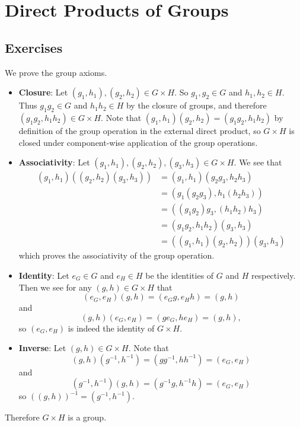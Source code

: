 \section{Direct Products of Groups}
\subsection*{Exercises}
\begin{questions}
    \item We prove the group axioms.
    \begin{itemize}
        \item \textbf{Closure}: Let $(g_1, h_1), (g_2, h_2) \in G \times H$. So $g_1, g_2 \in G$ and $h_1, h_2 \in H$. Thus $g_1g_2 \in G$ and $h_1h_2 \in H$ by the closure of groups, and therefore $(g_1g_2, h_1h_2) \in G\times H$. Note that $(g_1, h_1)(g_2, h_2) = (g_1g_2, h_1h_2)$ by definition of the group operation in the external direct product, so $G \times H$ is closed under component-wise application of the group operations.

        \item \textbf{Associativity}: Let $(g_1, h_1), (g_2, h_2), (g_3, h_3) \in G \times H$. We see that
        \begin{align*}
            (g_1, h_1)\left((g_2, h_2)(g_3, h_3)\right) &= (g_1, h_1)(g_2g_3, h_2h_3)\\
            &= (g_1(g_2g_3), h_1(h_2h_3))\\
            &= ((g_1g_2)g_3, (h_1h_2)h_3)\\
            &= (g_1g_2, h_1h_2)(g_3,h_3)\\
            &= \left((g_1,h_1)(g_2,h_2)\right)(g_3,h_3)
        \end{align*}
        which proves the associativity of the group operation.

        \item \textbf{Identity}: Let $e_G \in G$ and $e_H \in H$ be the identities of $G$ and $H$ respectively. Then we see for any $(g, h) \in G \times H$ that
        \[
            (e_G, e_H)(g, h) = (e_Gg, e_Hh) = (g, h)
        \]
        and
        \[
            (g, h)(e_G, e_H) = (ge_G, he_H) = (g, h),
        \]
        so $(e_G, e_H)$ is indeed the identity of $G \times H$.

        \item \textbf{Inverse}: Let $(g, h) \in G \times H$. Note that
        \[
            (g, h)(g^{-1}, h^{-1}) = (gg^{-1}, hh^{-1}) = (e_G, e_H)
        \]
        and
        \[
            (g^{-1}, h^{-1})(g, h) = (g^{-1}g, h^{-1}h) = (e_G, e_H)
        \]
        so $\left((g, h)\right)^{-1} = (g^{-1}, h^{-1})$.
    \end{itemize}
    Therefore $G \times H$ is a group.


\end{questions}
